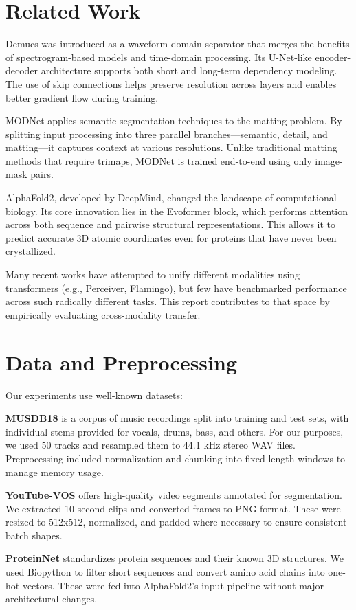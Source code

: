 \documentclass{article}
\begin{document}
\section{Related Work}
Demucs was introduced as a waveform-domain separator that merges the benefits of spectrogram-based models and time-domain processing. Its U-Net-like encoder-decoder architecture supports both short and long-term dependency modeling. The use of skip connections helps preserve resolution across layers and enables better gradient flow during training.

MODNet applies semantic segmentation techniques to the matting problem. By splitting input processing into three parallel branches—semantic, detail, and matting—it captures context at various resolutions. Unlike traditional matting methods that require trimaps, MODNet is trained end-to-end using only image-mask pairs.

AlphaFold2, developed by DeepMind, changed the landscape of computational biology. Its core innovation lies in the Evoformer block, which performs attention across both sequence and pairwise structural representations. This allows it to predict accurate 3D atomic coordinates even for proteins that have never been crystallized.

Many recent works have attempted to unify different modalities using transformers (e.g., Perceiver, Flamingo), but few have benchmarked performance across such radically different tasks. This report contributes to that space by empirically evaluating cross-modality transfer.

\section{Data and Preprocessing}
Our experiments use well-known datasets:

\textbf{MUSDB18} is a corpus of music recordings split into training and test sets, with individual stems provided for vocals, drums, bass, and others. For our purposes, we used 50 tracks and resampled them to 44.1 kHz stereo WAV files. Preprocessing included normalization and chunking into fixed-length windows to manage memory usage.

\textbf{YouTube-VOS} offers high-quality video segments annotated for segmentation. We extracted 10-second clips and converted frames to PNG format. These were resized to 512x512, normalized, and padded where necessary to ensure consistent batch shapes.

\textbf{ProteinNet} standardizes protein sequences and their known 3D structures. We used Biopython to filter short sequences and convert amino acid chains into one-hot vectors. These were fed into AlphaFold2’s input pipeline without major architectural changes.
\end{document}
